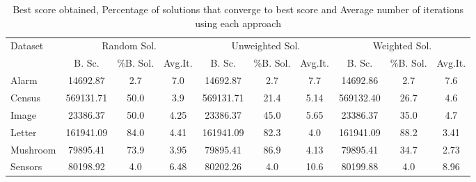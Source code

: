 	\begin{table}[ h ]
		\centering
		\begin{tabular}{ | l | c | c | c | c | c | c | c | c | c | }
			\hline
			Dataset & \multicolumn{3}{|c|}{Random Sol.} & \multicolumn{3}{|c|}{Unweighted Sol.} & \multicolumn{3}{|c|}{Weighted Sol.} \\ \cline{2-10}
			& B. Sc. & \%B. Sol. & Avg.It. & B. Sc. & \%B. Sol. & Avg.It. & B. Sc. & \%B. Sol. & Avg.It. \\ \hline
			Alarm & 14692.87 & 2.7 & 7.0 & 14692.87 & 2.7 & 7.7 & 14692.86 & 2.7 & 7.6 \\ \hline
			Census & 569131.71 & 50.0 & 3.9 & 569131.71 & 21.4 & 5.14 & 569132.40 & 26.7 & 4.6 \\ \hline
			Image & 23386.37 & 50.0 & 4.25 & 23386.37 & 45.0 & 5.65 & 23386.37 & 35.0 & 4.7 \\ \hline
			Letter & 161941.09 & 84.0 & 4.41 & 161941.09 & 82.3 & 4.0 & 161941.09 & 88.2 & 3.41 \\ \hline
			Mushroom & 79895.41 & 73.9 & 3.95 & 79895.41 & 86.9 & 4.13 & 79895.41 & 34.7 & 2.73 \\ \hline
			Sensors & 80198.92 & 4.0 & 6.48 & 80202.26 & 4.0 & 10.6 & 80199.88 & 4.0 & 8.96 \\ \hline
		\end{tabular}
		\caption{Best score obtained, Percentage of solutions that converge to best score and Average number of iterations using each approach}
		\label{tab:comparison}
	\end{table}
	
